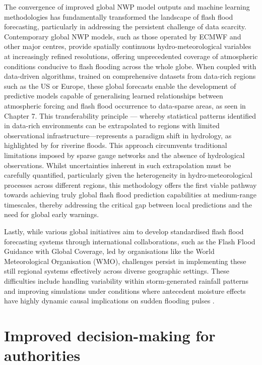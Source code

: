 The convergence of improved global NWP model outputs and machine learning methodologies has fundamentally transformed the landscape of flash flood forecasting, particularly in addressing the persistent challenge of data scarcity. Contemporary global NWP models, such as those operated by ECMWF and other major centres, provide spatially continuous hydro-meteorological variables at increasingly refined resolutions, offering unprecedented coverage of atmospheric conditions conducive to flash flooding across the whole globe. When coupled with data-driven algorithms, trained on comprehensive datasets from data-rich regions such as the US or Europe, these global forecasts enable the development of predictive models capable of generalising learned relationships between atmospheric forcing and flash flood occurrence to data-sparse areas, as seen in Chapter 7. This transferability principle — whereby statistical patterns identified in data-rich environments can be extrapolated to regions with limited observational infrastructure—represents a paradigm shift in hydrology, as highlighted by \citep{Kratzert_2024} for riverine floods. This approach circumvents traditional limitations imposed by sparse gauge networks and the absence of hydrological observations. Whilst uncertainties inherent in such extrapolation must be carefully quantified, particularly given the heterogeneity in hydro-meteorological processes across different regions, this methodology offers the first viable pathway towards achieving truly global flash flood prediction capabilities at medium-range timescales, thereby addressing the critical gap between local predictions and the need for global early warnings.

Lastly, while various global initiatives aim to develop standardised flash flood forecasting systems through international collaborations, such as the Flash Flood Guidance with Global Coverage, led by organisations like the World Meteorological Organisation (WMO), challenges persist in implementing these still regional systems effectively across diverse geographic settings. These difficulties include handling variability within storm-generated rainfall patterns and improving simulations under conditions where antecedent moisture effects have highly dynamic causal implications on sudden flooding pulses \citep{Buzgaru2021}\citep{Msigwa2024}.


\section{Improved decision-making for authorities}

